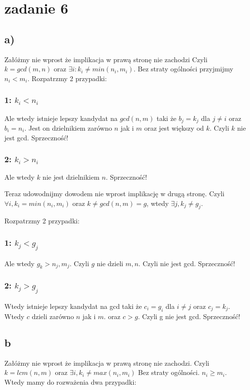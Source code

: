 \documentclass{article}
\begin{document}
\section*{zadanie 6}
\subsection*{a)}
Załóżmy nie wprost że implikacja w prawą stronę nie zachodzi
Czyli $k = gcd(m,n)$ oraz $\exists i: k_i \neq min(n_i, m_i)$. Bez straty ogólności przyjmijmy $n_i < m_i$.
Rozpatrzmy 2 przypadki:
\subsubsection*{1: $k_i < n_i$}

Ale wtedy istnieje lepszy kandydat na $gcd(n,m)$ taki że $b_j = k_j$ dla $j \neq i$ oraz $b_i = n_i$. Jest on dzielnikiem zarówno $n$ jak i $m$ oraz jest większy od $k$. Czyli $k$ nie jest gcd. Sprzeczność!

\subsubsection*{2: $k_i > n_i$}

Ale wtedy $k$ nie jest dzielnikiem $n$. Sprzeczność!


Teraz udowodnijmy dowodem nie wprost implikację w drugą stronę. Czyli 
$\forall i, k_i = min(n_i, m_i)$ oraz $k \neq gcd(n,m) = g$, wtedy $\exists j, k_j \neq g_j$.

Rozpatrzmy 2 przypadki:
\subsubsection*{1: $k_j < g_j$}
Ale wtedy $g_k > n_j, m_j$. Czyli $g$ nie dzieli $m, n$. Czyli nie jest gcd. Sprzeczność!

\subsubsection*{2: $k_j > g_j$}

Wtedy istnieje lepszy kandydat na gcd taki że $c_i = g_i$ dla $i \neq j$ oraz $c_j = k_j$. Wtedy $c$ dzieli zarówno $n$ jak i $m$. oraz $c > g$. Czyli g nie jest gcd. Sprzeczność!

\subsection*{b}
Załóżmy nie wprost że implikacja w prawą stronę nie zachodzi. Czyli $k = lcm(n,m)$ oraz $\exists i, k_i \neq max(n_i, m_i)$ Bez straty ogólności. $n_i \geq m_i$. Wtedy mamy do rozważenia dwa przypadki:
\end{document}

